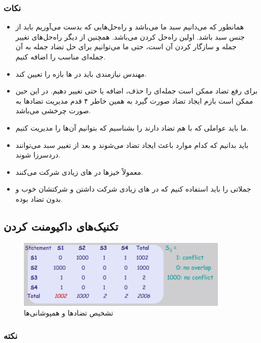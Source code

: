 \subsubsection*{نکات}

\begin{itemize}
    \item همانطور که می‌دانیم  سبد ما می‌باشد و راه‌حل‌هایی که
    بدست می‌آوریم باید از جنس سبد باشد. اولین راه‌حل  کردن می‌باشد.
    همچنین از دیگر راه‌حل‌های تغییر جمله و سازگار کردن آن است، حتی ما می‌توانیم
    برای حل تضاد جمله به آن جمله‌ای مناسب را اضافه کنیم.
    \item مهندس نیازمندی باید در ها بازه را تعیین کند.
    \item برای رفع تضاد ممکن است جمله‌ای را حذف، اضافه یا حتی تغییر دهیم. در این
    حین ممکن است بازم ایجاد تضاد صورت گیرد به همین خاطر ۴ قدم مدیریت تضاد‌ها به
    صورت چرخشی می‌باشد.
    \item ما باید عواملی که با هم تضاد دارند را بشناسیم که بتوانیم آن‌ها را
    مدیریت کنیم.
    \item باید بدانیم که کدام موارد باعث ایجاد تضاد می‌شوند و بعد از تغییر سبد
    می‌توانند دردسرزا شوند.
    \item معمولاً خیز‌ها در  های زیادی شرکت می‌کنند.
    \item جملاتی را باید استفاده کنیم که در های زیادی شرکت داشتن و
    شرکتشان خوب و بدون تضاد بوده.
\end{itemize}

\subsection{تکنیک‌های داکیومنت کردن}

\begin{figure}[H]
    \centering
    \includegraphics[width=0.9\textwidth]{images/systematic_process_table.png}
    \caption{تشخیص تضاد‌ها و همپوشانی‌ها}
\end{figure}

\subsubsection*{نکته}

